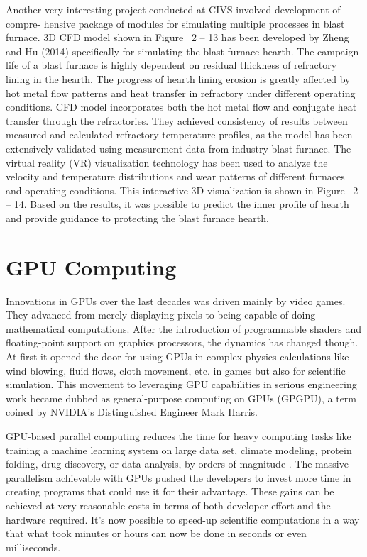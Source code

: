 Another very interesting project conducted at CIVS involved development of compre- hensive package of modules for simulating multiple processes in blast furnace. 3D CFD model shown in Figure~ 2 – 13 has been developed by Zheng and Hu (2014) specifically for simulating the blast furnace hearth. The campaign life of a blast furnace is highly dependent on residual thickness of refractory lining in the hearth. The progress of hearth lining erosion is greatly affected by hot metal flow patterns and heat transfer in refractory under different operating conditions. CFD model incorporates both the hot metal flow and conjugate heat transfer through the refractories. They achieved consistency of results between measured and calculated refractory temperature profiles, as the model has been extensively validated using measurement data from industry blast furnace. The virtual reality (VR) visualization technology has been used to analyze the velocity and temperature distributions and wear patterns of different furnaces and operating conditions. This interactive 3D visualization is shown in Figure~ 2 – 14. Based on the results, it was possible to predict the inner profile of hearth and provide guidance to protecting the blast furnace hearth.



\section{GPU Computing}

\label{gpu-computing}
Innovations in GPUs over the last decades was driven mainly by video games. They advanced from merely displaying pixels to being capable of doing mathematical computations. After the introduction of programmable shaders and floating-point support on graphics processors, the dynamics has changed though. At first it opened the door for using GPUs in complex physics calculations like wind blowing, fluid flows, cloth movement, etc. in games but also for scientific simulation. This movement to leveraging GPU capabilities in serious engineering work became dubbed as general-purpose computing on GPUs (GPGPU), a term coined by NVIDIA's Distinguished Engineer Mark Harris.

GPU-based parallel computing reduces the time for heavy computing tasks like training a machine learning system on large data set, climate modeling, protein folding, drug discovery, or data analysis, by orders of magnitude \citep{stortiCUDAEngineersIntroduction2016, PACHECO20111}. The massive parallelism achievable with GPUs pushed the developers to invest more time in creating programs that could use it for their advantage. These gains can be achieved at very reasonable costs in terms of both developer effort and the hardware required. It's now possible to speed-up scientific computations in a way that what took minutes or hours can now be done in seconds or even milliseconds.

